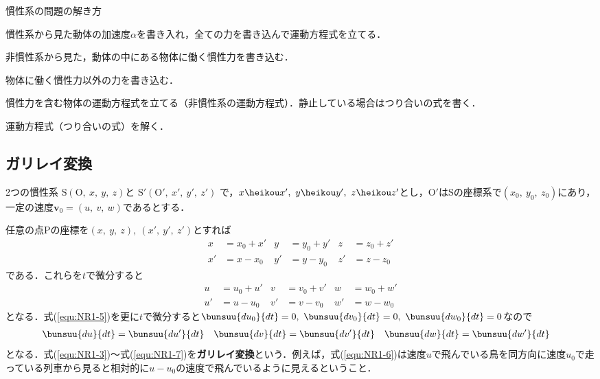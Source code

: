 慣性系の問題の解き方
\begin{enumerate}[label=\textbf{[\arabic*]}, labelsep=10pt, leftmargin=23pt]
	\item 慣性系から見た動体の加速度$\alpha$を書き入れ，全ての力を書き込んで運動方程式を立てる．
	\item 非慣性系から見た，動体の中にある物体に働く慣性力を書き込む．
	\item 物体に働く慣性力以外の力を書き込む．
	\item 慣性力を含む物体の運動方程式を立てる（非慣性系の運動方程式）．静止している場合はつり合いの式を書く．
	\item 運動方程式（つり合いの式）を解く．
\end{enumerate}



\subsection{ガリレイ変換}

2つの慣性系
$\mathrm{S}(\mathrm{O},\ x,\ y,\ z)$と
$\mathrm{S}'(\mathrm{O}',\ x',\ y',\ z')$
で，$x \heikou x',\ y \heikou y',\ z \heikou z'$とし，$\mathrm{O}'$は$\mathrm{S}$の座標系で$(x_0,\ y_0,\ z_0)$にあり，一定の速度$\bm{v}_0 = (u,\ v,\ w)$であるとする．

任意の点$\mathrm{P}$の座標を$(x,\ y,\ z),\ (x',\ y',\ z')$とすれば
\begin{align}
	x &= x_0 + x' & y &= y_0 + y' & z &= z_0 + z' \label{equ:NR1-3}\\
	x' &= x - x_0 & y' &= y - y_0 & z' &= z - z_0 \label{equ:NR1-4}
\end{align}
である．これらを$t$で微分すると
\begin{align}
	u &= u_0 + u' & v &= v_0 + v' & w &= w_0 + w' \label{equ:NR1-5}\\
	u' &= u - u_0 & v' &= v - v_0 & w' &= w - w_0 \label{equ:NR1-6}
\end{align}
となる．式(\ref{equ:NR1-5})を更に$t$で微分すると$\bunsuu{du_0}{dt} = 0,\ \bunsuu{dv_0}{dt} = 0,\ \bunsuu{dw_0}{dt} = 0$なので
\begin{align}
	\bunsuu{du}{dt} &= \bunsuu{du'}{dt} &
	\bunsuu{dv}{dt} &= \bunsuu{dv'}{dt} &
	\bunsuu{dw}{dt} &= \bunsuu{dw'}{dt} \label{equ4-7}
\end{align}
となる．式(\ref{equ:NR1-3})～式(\ref{equ:NR1-7})を\textbf{ガリレイ変換}という．例えば，式(\ref{equ:NR1-6})は速度$u$で飛んでいる鳥を同方向に速度$u_0$で走っている列車から見ると相対的に$u - u_0$の速度で飛んでいるように見えるということ．

